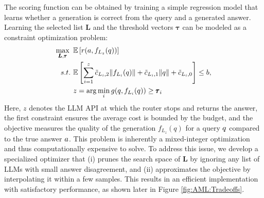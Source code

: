 \documentclass{article}
\begin{document}
The scoring function can be obtained by training a simple regression model that learns whether a generation is correct from the query and a generated answer. Learning the selected list $\pmb L$ and the threshold vectors $\pmb \tau$ can be modeled as a constraint optimization problem:
\begin{equation*}
    \begin{split}
        \max_{\pmb L, \pmb \tau}  \textit{ }& \mathbb{E}\left[r(a,f_{L_z}(q))\right]\\
    s.t. \textit{ }& \mathbb{E}\left[\sum_{i=1}^{z} \tilde{c}_{L_i,2} \|f_{L_i}(q)\|+\tilde{c}_{L_i,1} \|q\|+ \tilde{c}_{L_i,0}\right]\leq b,    \\
    & z = \arg\min_i g(q,f_{L_i}(q)) \geq  \pmb \tau_i
    \end{split}
\end{equation*}
Here, $z$ denotes the LLM API at which the router stops and returns the answer, the first constraint ensures the average cost is bounded by the budget, and the objective measures the quality of the generation $f_{L_z}(q)$ for a query $q$ compared to the true answer $a$. This problem is inherently a mixed-integer optimization and thus computationally expensive to solve. To address this issue, we develop a specialized optimizer that (i) prunes the search space of $\pmb L$ by ignoring any list of LLMs with small answer disagreement, and (ii) approximates the objective by interpolating it within a few samples. This results in an efficient implementation with satisfactory performance, as  shown later in Figure \ref{fig:AML:Tradeoffs}.



\end{document}
